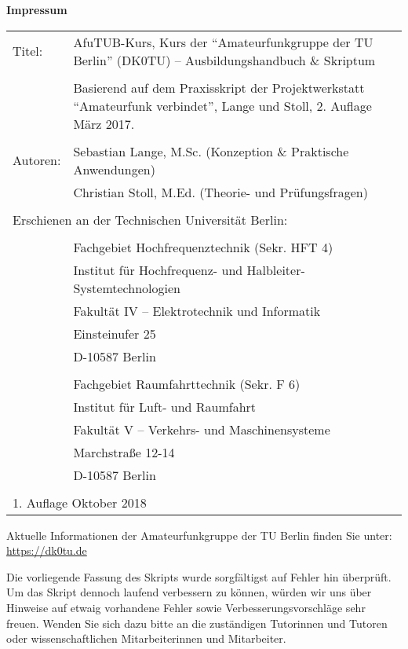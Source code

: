 \thispagestyle{empty}

\hspace{.1cm}
\begin{minipage}[t]{13cm}

  \textbf{Impressum}\\

  \begin{tabular}{p{1cm} p{11cm}}
    Titel: & AfuTUB-Kurs, Kurs der "`Amateurfunkgruppe der TU Berlin"' (DK0TU)
             -- Ausbildungshandbuch \& Skriptum \\
    & \\
    & Basierend auf dem Praxisskript der Projektwerkstatt "`Amateurfunk
      verbindet"', Lange und Stoll, 2.  Auflage März 2017.\\
    & \\
    Autoren: & Sebastian Lange, M.Sc. (Konzeption \& Praktische Anwendungen)\\
             & Christian Stoll, M.Ed. (Theorie- und Prüfungsfragen)\\
    & \\
    \multicolumn{2}{l}{Erschienen an der Technischen Universität Berlin:}\\
    &\\
    & Fachgebiet Hochfrequenztechnik (Sekr. HFT 4)\\
    & Institut für Hochfrequenz- und Halbleiter-Systemtechnologien\\
    & Fakultät IV -- Elektrotechnik und Informatik \\
    & Einsteinufer 25 \\
    & D-10587 Berlin \\
    & \\
    & Fachgebiet Raumfahrttechnik (Sekr. F 6)\\
    & Institut für Luft- und Raumfahrt\\
    & Fakultät V -- Verkehrs- und Maschinensysteme\\
    & Marchstraße 12-14\\
    & D-10587 Berlin\\
    &\\
    \multicolumn{2}{l}{1. Auflage Oktober 2018}\\
  \end{tabular}

  \vspace{3cm}

  Aktuelle Informationen der Amateurfunkgruppe der TU Berlin finden Sie unter:\\
  \url{https://dk0tu.de}

  \vspace{1cm}

  Die vorliegende Fassung des Skripts wurde sorgfältigst auf Fehler hin
  überprüft. Um das Skript dennoch laufend verbessern zu können, würden wir uns
  über Hinweise auf etwaig vorhandene Fehler sowie Verbesserungsvorschläge sehr
  freuen. Wenden Sie sich dazu bitte an die zuständigen Tutorinnen und Tutoren
  oder wissenschaftlichen Mitarbeiterinnen und Mitarbeiter.

\end{minipage}

